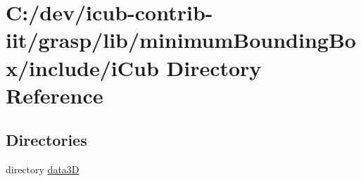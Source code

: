 \section{C\+:/dev/icub-\/contrib-\/iit/grasp/lib/minimum\+Bounding\+Box/include/i\+Cub Directory Reference}
\label{dir_c0f5c009eb99e38f1612d11fd15255eb}
\subsection*{Directories}
\begin{DoxyCompactItemize}
\item 
directory \hyperlink{dir_8d4074a084bebdaf3f815ef80999fbc8}{data3\+D}
\end{DoxyCompactItemize}
